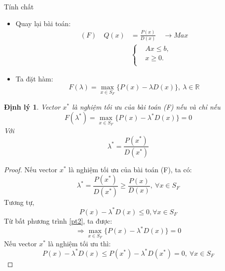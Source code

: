\documentclass{beamer}
\newtheorem{dl}{Định lý}[section]
\begin{document}
\begin{frame}{Tính chất} \large
\begin{itemize}
\item Quay lại bài toán:
\begin{equation} \label{F}
    \begin{split}
    (F) \quad Q(x) & = \frac{P(x)}{D(x)} \quad \longrightarrow Max \\
        & \left\{
        \begin{split}
        &Ax \leq  b, \\
        &x \geq 0. \\
        \end{split}
        \right.    
    \end{split}
\end{equation}            
\item Ta đặt hàm:
\begin{equation}
F(\lambda) = \underset{x \in S_F}{\max}\{P(x)-\lambda D(x)\}, \: \lambda \in \mathbb{R}
\end{equation}
\end{itemize}
\end{frame}

\begin{frame}
\begin{dl}
Vector $x^*$ là nghiệm tối ưu của bài toán (F) nếu và chỉ nếu 
\begin{equation}
F(\lambda^*) = \underset{x \in S_F}{\max}\{P(x)-\lambda^* D(x)\} = 0 
\end{equation}
Với
\begin{equation}
\lambda^* = \frac{P(x^*)}{D(x^*)}
\end{equation}
\end{dl}
\end{frame}

\begin{frame}
\begin{proof}
Nếu vector $x^*$ là nghiệm tối ưu của bài toán (F), ta có:
\begin{equation*}
\lambda^* = \frac{P(x^*)}{D(x^*)} \geq \frac{P(x)}{D(x)}, \: \forall x \in S_F
\end{equation*}
Tương tự,
\begin{equation} \label{pt2}
P(x)-\lambda^* D(x) \leq 0,  \forall x \in S_F
\end{equation}
Từ bất phương trình \eqref{pt2}, ta được:
\begin{equation*}
\Rightarrow \underset{x \in S_F}{\max}\{P(x)-\lambda^* D(x)\} = 0
\end{equation*}
Nếu vector $x^*$ là nghiệm tối ưu thì:
\begin{equation*}
P(x)-\lambda^*D(x) \leq P(x^*)-\lambda^* D(x^*) = 0, \: \forall x \in S_F
\end{equation*}
\end{proof}
\end{frame}
\end{document}
